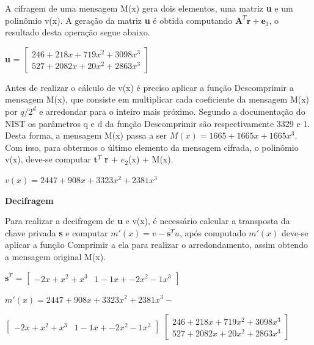     A cifragem de uma mensagem M(x) gera dois elementos, uma matriz \textbf{u} e um polinômio v(x). A geração da matriz \textbf{u} é obtida computando $\textbf{A}^T \textbf{r} + \textbf{e}_1$, o resultado desta operação segue abaixo. 

    
    \begin{center}
        \textbf{u} = $\begin{bmatrix}
            246 + 218 x + 719 x^2 + 3098 x^3 \\
            527 + 2082 x + 20 x^2 + 2863 x^3
        \end{bmatrix}$
    \end{center}

    Antes de realizar o cálculo de v(x) é preciso aplicar a função Descomprimir a mensagem M(x), que consiste em multiplicar cada coeficiente da mensagem M(x) por $q/2^d$ e arredondar para o inteiro mais próximo. Segundo a documentação do \ac{NIST} os parâmetros q e d da função Descomprimir são respectivamente 3329 e 1. Desta forma, a mensagem M(x) passa a ser $M(x) = 1665 + 1665x + 1665 x^3$. Com isso, para obtermos o último elemento da mensagem cifrada, o polinômio v(x), deve-se computar $\textbf{t}^T$ \textbf{r} + $e_2$(x) + M(x).

    \begin{center}
        $v(x) = 2447 + 908 x + 3323 x^2 + 2381 x^3$
    \end{center}

    \noindent
    \textbf{Decifragem}

    Para realizar a decifragem de \textbf{u} e v(x), é necessário calcular a transposta da chave privada \textbf{s} e computar $m'(x) = v - \textbf{s}^T u$, após computado $m'(x)$ deve-se aplicar a função Comprimir a ela para realizar o arredondamento, assim obtendo a mensagem original M(x). 

    \begin{center}
            $\textbf{s}^T$ = $\begin{bmatrix}
               -2 x + x^2 + x^3 & 1 - 1 x + -2 x^2 - 1 x^3
            \end{bmatrix}$
    \end{center}
    
    \begin{center}
            $m'(x) = 2447 + 908 x + 3323 x^2 + 2381 x^3 -$
            
            $\begin{bmatrix}
               -2 x + x^2 + x^3 & 1 - 1 x + -2 x^2 - 1 x^3
            \end{bmatrix}$
            $\begin{bmatrix}
            246 + 218 x + 719 x^2 + 3098 x^3 \\
            527 + 2082 x + 20 x^2 + 2863 x^3
        \end{bmatrix}$
    \end{center}

